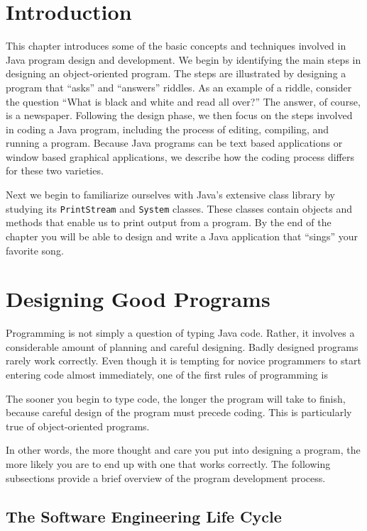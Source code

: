 \section{Introduction}

\noindent This chapter  introduces some of the basic 
concepts and techniques involved in Java program design and
development.  We begin by identifying the main steps in designing an
object-oriented program. The steps are illustrated by designing a
program that ``asks'' and ``answers'' riddles. As an example of a
riddle, consider the question ``What is black and white and read all
over?''  The answer, of course, is a newspaper.  Following the design
phase, we then focus on the steps involved in coding a Java program,
including the process of editing, compiling, and running a
program. Because Java programs can be text based applications or
window based graphical applications, we describe how the coding process differs for these two
varieties.

Next we begin to familiarize ourselves with Java's extensive class
library by studying its {\tt PrintStream} and {\tt System}
classes.  These classes contain objects and methods that enable us to
print output from a program.  By the end of the chapter you will be
able to design and write a Java application that ``sings'' your
favorite song. 

\section{Designing Good Programs}

\noindent Programming is not simply a question of typing Java code.
Rather, it involves a considerable amount of planning and careful
designing.  Badly designed programs rarely work correctly.  Even
though it is tempting for novice programmers to start entering code
almost immediately, one of the first rules of programming is

%
{The sooner you begin to type code, the longer the program will take to
finish, because careful design of the program must precede
coding. This is particularly true of object-oriented programs.}

\noindent In other words, the more thought and care you put into
designing a program, the more likely you are to end up with one
that works correctly.  The following subsections provide a brief overview
of the program development process.

\subsection{The Software Engineering Life Cycle}

